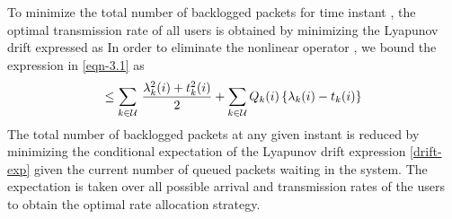 To minimize the total number of backlogged packets for time instant , the optimal transmission rate of all users is obtained by minimizing the Lyapunov drift expressed as  
\iftoggle{single_column}{
\begin{equation} \label{eqn-3.1}
\mathrm{L}\sset{\mbf{Q}(i+1)} - \mathrm{L}\sset{\mbf{Q}(i)} = \frac{1}{2} \Big [ \sum_{k \in \mc{U}} \, \Big ( \left [ Q_k(i) - t_k(i) \right ]^+ + \lambda_k(i) \Big )^2 - Q^2_k(i) \Big ].
\end{equation}}{
\begin{multline} \label{eqn-3.1}
\mathrm{L}\sset{\mbf{Q}(i+1)} - \mathrm{L}\sset{\mbf{Q}(i)} = \\ \frac{1}{2} \Big [ \sum_{k \in \mc{U}} \, \Big ( \left [ Q_k(i) - t_k(i) \right ]^+ + \lambda_k(i) \Big )^2 - Q^2_k(i) \Big ].
\end{multline}}
In order to eliminate the nonlinear operator \me{[x]^+}, we bound the expression in \eqref{eqn-3.1} as
\begin{equation}
\leq \sum_{k \in \mc{U}} \, \frac{\lambda^2_k(i) + t_k^2(i)}{2} + \sum_{k \in \mc{U}} Q_k(i) \set{ \lambda_k(i) - t_k(i) }
\label{drift-exp}
\end{equation}
The total number of backlogged packets at any given instant  is reduced by minimizing the conditional expectation of the Lyapunov drift expression \eqref{drift-exp} given the current number of queued packets  waiting in the system. The expectation is taken over all possible arrival and transmission rates of the users to obtain the optimal rate allocation strategy. 

